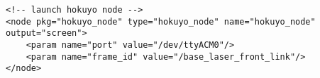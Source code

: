 \begin{lstlisting}[label=source.launchHokuyo,caption=Launchfile zum Start der hokuyo\_node]
<!-- launch hokuyo node -->
<node pkg="hokuyo_node" type="hokuyo_node" name="hokuyo_node" output="screen">
	<param name="port" value="/dev/ttyACM0"/>
	<param name="frame_id" value="/base_laser_front_link"/>
</node>
\end{lstlisting}